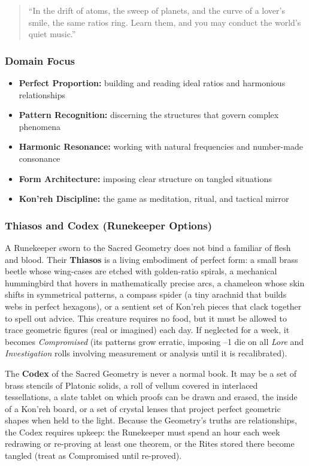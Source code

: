 \begin{quote}
``In the drift of atoms, the sweep of planets, and the curve of a lover's smile, the same ratios ring. Learn them, and you may conduct the world's quiet music.''
\end{quote}

\subsubsection*{Domain Focus}
\begin{itemize}
  \item \textbf{Perfect Proportion:} building and reading ideal ratios and harmonious relationships
  \item \textbf{Pattern Recognition:} discerning the structures that govern complex phenomena
  \item \textbf{Harmonic Resonance:} working with natural frequencies and number-made consonance
  \item \textbf{Form Architecture:} imposing clear structure on tangled situations
  \item \textbf{Kon'reh Discipline:} the game as meditation, ritual, and tactical mirror
\end{itemize}

\subsubsection*{Thiasos and Codex (Runekeeper Options)}

A Runekeeper sworn to the Sacred Geometry does not bind a familiar of flesh and blood. Their \textbf{Thiasos} is a living embodiment of perfect form: a small brass beetle whose wing-cases are etched with golden-ratio spirals, a mechanical hummingbird that hovers in mathematically precise arcs, a chameleon whose skin shifts in symmetrical patterns, a compass spider (a tiny arachnid that builds webs in perfect hexagons), or a sentient set of Kon'reh pieces that clack together to spell out advice. This creature requires no food, but it must be allowed to trace geometric figures (real or imagined) each day. If neglected for a week, it becomes \textit{Compromised} (its patterns grow erratic, imposing --1 die on all \textit{Lore} and \textit{Investigation} rolls involving measurement or analysis until it is recalibrated).

The \textbf{Codex} of the Sacred Geometry is never a normal book. It may be a set of brass stencils of Platonic solids, a roll of vellum covered in interlaced tessellations, a slate tablet on which proofs can be drawn and erased, the inside of a Kon'reh board, or a set of crystal lenses that project perfect geometric shapes when held to the light. Because the Geometry's truths are relationships, the Codex requires upkeep: the Runekeeper must spend an hour each week redrawing or re-proving at least one theorem, or the Rites stored there become tangled (treat as Compromised until re-proved).

